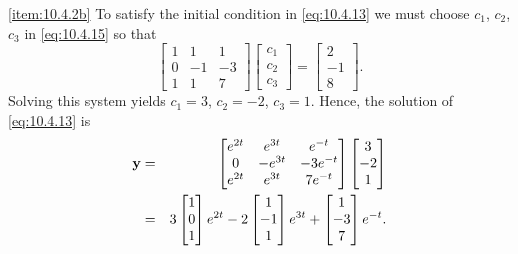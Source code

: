 \documentclass{ximera}
\begin{document}
\begin{example}
\begin{explanation}
\ref{item:10.4.2b}
 To satisfy the initial condition in  \eqref{eq:10.4.13} we must choose
$c_1$, $c_2$, $c_3$ in  \eqref{eq:10.4.15} so that
$$
\begin{bmatrix}1&1&1\\0&-1&-3\\
1&1&7\end{bmatrix}
\begin{bmatrix} c_1\\c_2\\c_3\end{bmatrix}=
\begin{bmatrix}2\\-1\\8\end{bmatrix}.
$$
Solving this system yields $c_1=3$, $c_2=-2$, $c_3=1$.  Hence, the solution
of  \eqref{eq:10.4.13} is
\begin{eqnarray*}
{\bf y}&=&\begin{bmatrix}e^{2t}&e^{3t}&
e^{-t}\\0&-e^{3t}
&-3e^{-t}\\e^{2t}&e^{3t}&7e^{-t}\end{bmatrix}
\begin{bmatrix}3\\-2\\1\end{bmatrix}\\
&=&3\begin{bmatrix}1\\0\\1\end{bmatrix}e^{2t}-2
\begin{bmatrix}1\\-1\\1\end{bmatrix}
e^{3t}+\begin{bmatrix}1\\-3\\7\end{bmatrix}e^{-t}.
\end{eqnarray*}
\end{explanation}
\end{example}
\end{document}
